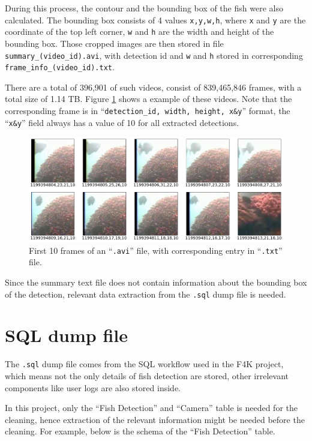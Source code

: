 \documentclass[bsc,frontabs,twoside,fullspacing,parskip,deptreport]{infthesis}
\begin{document}
During this process, the contour and the bounding box of the fish were also calculated.
The bounding box consists of 4 values {\tt x,y,w,h}, where {\tt x} and {\tt y} are the coordinate of the top left corner, {\tt w} and {\tt h} are the width and height of the bounding box. 
Those cropped images are then stored in file {\tt summary\_(video\_id).avi}, with detection id and {\tt w} and {\tt h} stored in corresponding {\tt frame\_info\_(video\_id).txt}.

There are a total of 396,901 of such videos, consist of 839,465,846 frames, with a total size of 1.14 TB. 
Figure \ref{fig:summryfile} shows a example of these videos. 
Note that the corresponding frame is in ``{\tt detection\_id, width, height, x\&y}'' format, the ``{\tt x\&y}'' field always has a value of 10 for all extracted detections.

\begin{figure}[h]
    \centering
    \includegraphics[scale=0.35]{graph/summaryfile.png}
    \caption{First 10 frames of an ``{\tt .avi}'' file, with corresponding entry in ``{\tt .txt}'' file.}
    \label{fig:summryfile}
\end{figure}

Since the summary text file does not contain information about the bounding box of the detection, relevant data extraction from the {\tt .sql} dump file is needed.

\section{SQL dump file}
\label{sec:sqld}

The {\tt .sql} dump file comes from the SQL workflow used in the F4K project, which means not the only details of fish detection are stored, other irrelevant components like user logs are also stored inside. 

In this project, only the ``Fish Detection'' and ``Camera'' table is needed for the cleaning, hence extraction of the relevant information might be needed before the cleaning.
For example, below is the schema of the ``Fish Detection'' table. 
\end{document}
